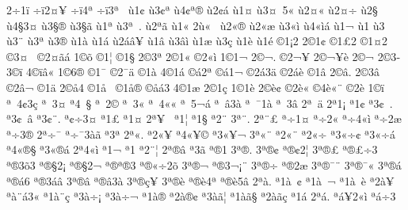 {2^^f71^^ef
^^f7^^ef2^^a4^^a5
^^f7^^ef4^^aa
^^f7^^ef3^^aa^^a0
^^f91^^a2
^^f93^^a2^^aa
^^f94^^a2^^aa^^ae
^^f92^^a2^^e1
^^f91^^a4
^^f93^^a4^^a05^^ab
^^f92^^a4^^ab
^^f92^^a4^^ad^^f7
^^f92^^a7
^^f94^^a73^^a4
^^f93^^a7^^ae
^^f93^^a7^^e3
^^f91^^aa
^^f93^^aa^^a0.
^^f92^^aa^^e3
^^f91^^ab
2^^f9^^ab^^a0
^^f92^^ab^^ae
^^f92^^ab^^e6
^^f93^^ab^^ec
^^f94^^ab^^ec^^e1
^^f91^^ac
^^f91^^ad
^^f93^^ad^^a0
^^f93^^ad^^a8
^^f93^^ad^^aa
^^f93^^ad^^ae
^^f91^^e0
^^f91^^e1
^^f92^^e1^^e2^^a5
^^f91^^e2
^^f93^^e2^^ec
^^f91^^e6
^^f93^^e7
^^f91^^e8
^^f91^^e9
^^a91^^a12
2^^a91^^a2
^^a91^^a32
^^a91^^a42
^^a93^^a4^^a0
^^a92^^a4^^e3^^e1
1^^a9^^f5
^^a91^^a6
^^a91^^a7
2^^a93^^aa
2^^a91^^ab
^^a92^^ab^^ec
1^^a91^^ac
2^^a9^^ac.
^^a92^^ac^^a5^^ad
2^^a9^^ac^^a5^^ad^^e8
2^^a9^^ac^^ad
2^^a93^^ad
3^^a9^^ad^^ef
4^^a9^^ad^^ef^^e2^^ab
1^^a96^^ae
^^a91^^af
^^a92^^af^^e4
^^a91^^e0
4^^a91^^e1
^^a9^^e12^^aa
^^a9^^e11^^ac
^^a92^^e13^^e4
^^a92^^e1^^e8
^^a91^^e2
2^^a9^^e2.
2^^a93^^e2^^a0
^^a92^^e2^^ac
^^a91^^e4
2^^a9^^e54
^^a91^^e5^^a0
^^a91^^e5^^ae
^^a9^^e5^^e13
4^^a91^^e6
2^^a91^^e7
1^^a91^^e8
2^^a9^^e8^^a2
^^a92^^e8^^ab
^^a94^^e8^^ab^^a8
^^a92^^e8^^ad
1^^a9^^ef
^^aa^^a04^^a23^^e7
^^aa^^a03^^a4
^^aa4^^a0^^a7
^^aa^^a02^^a9
^^aa^^a03^^ab
^^aa^^a04^^ab^^ab
^^aa^^a05^^ac^^e1
^^aa^^a0^^ad^^e23^^e0
^^aa^^a0^^af1^^e0
^^aa^^a03^^e2
2^^aa^^a0^^e4
2^^aa1^^a1
^^aa1^^a2
^^aa3^^a2^^a0.
^^aa3^^a2^^a0^^e2
^^aa3^^a2^^a8.
^^aa^^a2^^f73^^a4
^^aa1^^a3
^^aa1^^a4
2^^aa^^a5^^a0
^^aa1^^a6
^^aa1^^a7
^^aa2^^a8
3^^aa^^a8.
2^^aa^^a8^^a3
^^aa^^f71^^a4
^^aa^^f72^^ab
^^aa^^f74^^ab^^ec
^^aa^^f72^^ad^^e6
^^aa^^f73^^ae
2^^aa^^f7^^af
^^aa^^f7^^af3^^e0^^e3
^^aa3^^aa
2^^aa^^ab.
^^aa2^^ab^^a5
^^aa4^^ab^^a5^^a9
^^aa3^^ab^^a5^^ac
3^^aa^^ab^^a8
^^aa2^^ab^^a8^^ad
^^aa2^^ab^^f7
^^aa3^^ab^^f7^^a2
^^aa3^^ab^^f7^^e1
^^aa4^^ab^^ae^^a7
^^aa3^^ab^^ae^^e1
2^^aa4^^ab^^ec
^^aa1^^ac
^^aa1^^ad
^^aa2^^ad^^a8^^a6
2^^aa^^ad^^ae^^e2
^^aa3^^ad^^e3
^^aa^^ae1
3^^aa^^ae.
3^^aa^^ae^^a2
^^aa^^ae^^a22^^a6
3^^aa^^ae^^a3
^^aa^^ae^^a3^^f73
^^aa^^ae3^^f53
^^aa^^ae^^a72^^a1
^^aa^^ae^^a72^^ac
^^aa^^ae^^aa^^ae3
^^aa^^ae^^ab^^f72^^f5
3^^aa^^ae^^ac
^^aa^^ae3^^ac^^a1^^a8
3^^aa^^ae^^ad^^f7
^^aa^^ae2^^ad^^e6
3^^aa^^ae^^af^^a8
3^^aa^^ae^^af^^ab
3^^aa^^ae^^e1
^^aa^^ae^^e16^^ad
^^aa^^ae3^^e1^^e2
3^^aa^^ae^^e2
^^aa^^ae^^e23^^e0
3^^aa^^ae^^e7^^a5
3^^aa^^ae^^e8
^^aa^^ae^^e84^^aa
^^aa^^ae^^e85^^e2
2^^aa^^e0.
^^aa1^^e0^^a0^^a2
^^aa1^^e0^^a0^^ac
^^aa1^^e0^^a0^^e8
^^aa2^^e0^^a5^^a0
^^aa^^e0^^a8^^e13^^ab
^^aa1^^e0^^a8^^e7
^^aa3^^e0^^f7^^a1
^^aa3^^e0^^f7^^ac
^^aa1^^e0^^ae
^^aa2^^e0^^ae^^a2
^^aa3^^e0^^e3^^a6
^^aa1^^e0^^e3^^a7
^^aa2^^e0^^e3^^e7
^^aa1^^e1
2^^aa^^e1.
^^aa^^e1^^a52^^ab^^ec
^^aa^^e1^^f73
}
